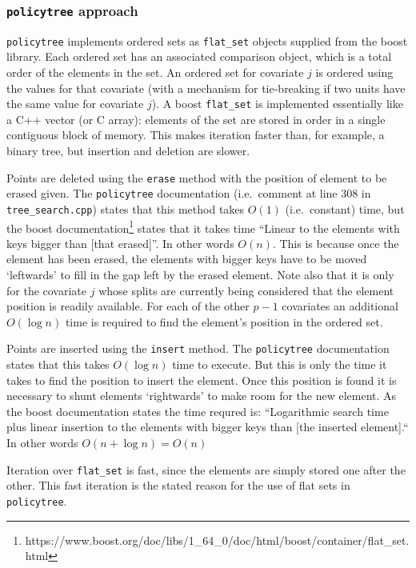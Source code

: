 \documentclass{article}
\newcommand{\policytree}{\texttt{policytree}}
\begin{document}
\subsubsection{\texttt{policytree} approach}
\label{sec:policytreeos}

\policytree{} implements ordered sets as \texttt{flat\_set} objects
supplied from the boost library. Each ordered set has an associated
comparison object, which is a total order of the elements in the
set. An ordered set for covariate $j$ is ordered using the values for
that covariate (with a mechanism for tie-breaking if two units have
the same value for covariate $j$). A boost \texttt{flat\_set} is
implemented essentially like a C++ vector (or C array): elements of
the set are stored in order in a single contiguous block of
memory. This makes iteration faster than, for example, a binary tree,
but insertion and deletion are slower.

Points are deleted using the \texttt{erase} method with the position
of element to be erased given. The \policytree{} documentation (i.e.\
comment at line 308 in \verb+tree_search.cpp+) states that this method
takes $O(1)$ (i.e.\ constant) time, but the boost
documentation\footnote{https://www.boost.org/doc/libs/1\_64\_0/doc/html/boost/container/flat\_set.html}
states that it takes time ``Linear to the elements with keys bigger
than [that erased]''. In other words $O(n)$. This is because once the
element has been erased, the elements with bigger keys have to be
moved `leftwards' to fill in the gap left by the erased element. Note
also that it is only for the covariate $j$ whose splits are currently
being considered that the element position is readily available. For
each of the other $p-1$ covariates an additional $O(\log n)$ time is
required to find the element's position in the ordered set.

Points are inserted using the \texttt{insert} method. The
\policytree{} documentation states that this takes $O(\log n)$ time to
execute. But this is only the time it takes to find the position to
insert the element. Once this position is found it is necessary to
shunt elements `rightwards' to make room for the new element. As the
boost documentation states the time requred is: ``Logarithmic search
time plus linear insertion to the elements with bigger keys than [the
inserted element].`` In other words $O(n + \log n) = O(n)$

Iteration over \texttt{flat\_set} is fast, since the elements are
simply stored one after the other. This fast iteration is the stated
reason for the use of flat sets in \policytree.
\end{document}

